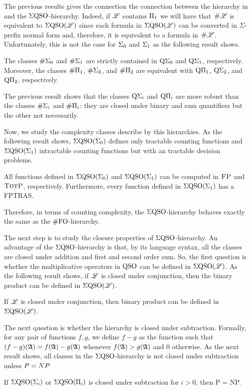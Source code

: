 The previous results gives the connection the connection between the hierarchy in \cite{DBLP:journals/jcss/SalujaST95} and the $\Sigma{\rm QSO}$-hierarchy. 
Indeed, if $\mathscr{L}$ contains $\Pi_{1}$ we will have that $\text{\sc \#} \mathscr{L}$ is equivalent to $\Sigma{\rm QSO}(\mathscr{L})$ since each formula in $\Sigma{\rm QSO}(\mathscr{L})$ can be converted in $\Sigma$-prefix normal form and, therefore, it is equivalent to a formula in $\text{\sc \#} \mathscr{L}$. 
Unfortunately, this is not the case for $\Sigma_{0}$ and $\Sigma_{1}$ as the following result shows.
\begin{proposition}
	The classes $\#\Sigma_{0}$ and $\#\Sigma_{1}$ are strictly contained in $\operatorname{Q}\!\Sigma_{0}$ and $\operatorname{Q}\!\Sigma_{1}$, respectively. Moreover, the classes $\#\Pi_{1}$, $\#\Sigma_{2}$, and $\#\Pi_{2}$ are equivalent with $\operatorname{Q}\!\Pi_{1}$, $\operatorname{Q}\!\Sigma_{2}$, and $\operatorname{Q}\!\Pi_{2}$, respectively.
\end{proposition}
The previous result shows that the classes $\operatorname{Q}\!\Sigma_{i}$ and $\operatorname{Q}\!\Pi_{i}$ are more robust than the classes $\#\Sigma_{i}$ and $\#\Pi_{i}$: they are closed under binary and sum quantifiers but the other not necessarily. 

Now, we study the complexity classes describe by this hierarchies. As the following result shows, $\Sigma{\rm QSO}(\Sigma_{0})$ defines only tractable counting functions and $\Sigma{\rm QSO}(\Sigma_{1})$ intractable counting functions but with an tractable decision problems. 
\begin{proposition}
All functions defined in $\Sigma{\rm QSO}(\Sigma_{0})$ and $\Sigma{\rm QSO}(\Sigma_{1})$ can be computed in $\text{\sc FP}$ and $\text{\sc TotP}$, respectively. Furthermore, every function defined in $\Sigma{\rm QSO}(\Sigma_{1})$ has a FPTRAS.
\end{proposition}
Therefore, in terms of counting complexity, the $\Sigma{\rm QSO}$-hierarchy behaves exactly the same as the $\#{\rm FO}$-hierarchy.

The next step is to study the closure properties of $\Sigma{\rm QSO}$-hierarchy. 
An advantage of the $\Sigma{\rm QSO}$-hierarchy is that, by its language syntax, all the classes are closed under addition and first and second order sum.
So, the first question is whether the multiplicative operators in ${\rm QSO}$ can be defined in $\Sigma{\rm QSO}(\mathscr{L})$. As the following result shows, if $\mathscr{L}$ is closed under conjunction, then the binary product can be defined in  $\Sigma{\rm QSO}(\mathscr{L})$.
\begin{theorem}\label{theo:binary-prod}
	If $\mathscr{L}$ is closed under conjunction, then binary product can be defined in $\Sigma{\rm QSO}(\mathscr{L})$.
\end{theorem}
The next question is whether the hierarchy is closed under subtraction. Formally, for any pair of functions $f,g$, we define $f - g$ as the function such that $(f - g)(\mathfrak{A}) = f(\mathfrak{A})-g(\mathfrak{A})$ whenever $f(\mathfrak{A})>g(\mathfrak{A})$ and $0$ otherwise.
As the next result shows, all classes in the $\Sigma{\rm QSO}$-hierarchy is not closed under subtraction unless ${\sc P} = {\sc NP}$
\begin{theorem} \label{sub-pnp}
If $\Sigma{\rm QSO}(\Sigma_{i})$ or $\Sigma{\rm QSO}(\Pi_{i})$ is closed under subtraction for $i > 0$, then {\sc P} = {\sc NP}.
\end{theorem}

